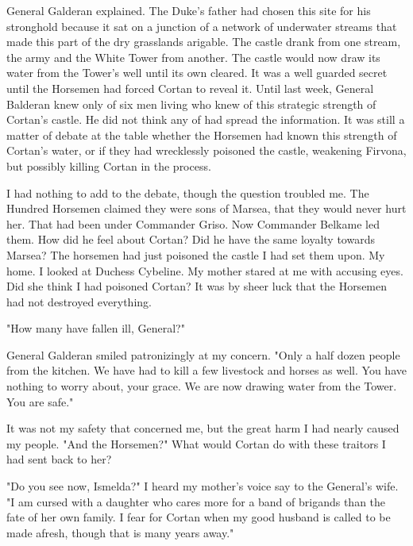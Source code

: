 \documentclass{article}
\begin{document}
General Galderan explained. The Duke's father had chosen this site for his stronghold because it sat on a junction of a network of underwater streams that made this part of the dry grasslands arigable. The castle drank from one stream, the army and the White Tower from another. The castle would now draw its water from the Tower's well until its own cleared. It was a well guarded secret until the Horsemen had forced Cortan to reveal it. Until last week, General Balderan knew only of six men living who knew of this strategic strength of Cortan's castle. He did not think any of had spread the information. It was still a matter of debate at the table whether the Horsemen had known this strength of Cortan's water, or if they had wrecklessly poisoned the castle, weakening Firvona, but possibly killing Cortan in the process.

I had nothing to add to the debate, though the question troubled me. The Hundred Horsemen claimed they were sons of Marsea, that they would never hurt her. That had been under Commander Griso. Now Commander Belkame led them. How did he feel about Cortan? Did he have the same loyalty towards Marsea? The horsemen had just poisoned the castle I had set them upon. My home. I looked at Duchess Cybeline. My mother stared at me with accusing eyes. Did she think I had poisoned Cortan? It was by sheer luck that the Horsemen had not destroyed everything.

"How many have fallen ill, General?"

General Galderan smiled patronizingly at my concern. "Only a half dozen people from the kitchen. We have had to kill a few livestock and horses as well. You have nothing to worry about, your grace. We are now drawing water from the Tower. You are safe."

It was not my safety that concerned me, but the great harm I had nearly caused my people. "And the Horsemen?" What would Cortan do with these traitors I had sent back to her?

"Do you see now, Ismelda?" I heard my mother's voice say to the General's wife. "I am cursed with a daughter who cares more for a band of brigands than the fate of her own family. I fear for Cortan when my good husband is called to be made afresh, though that is many years away."
\end{document}
